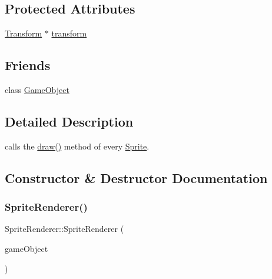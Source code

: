 \subsection*{Protected Attributes}
\begin{DoxyCompactItemize}
\item 
\hyperlink{class_mason_1_1_transform}{Transform} $\ast$ \hyperlink{class_mason_1_1_sprite_renderer_a211ffbdb50dae44315ff54ce808409bc}{transform}
\end{DoxyCompactItemize}
\subsection*{Friends}
\begin{DoxyCompactItemize}
\item 
class \hyperlink{class_mason_1_1_sprite_renderer_a00df87c957d8f7ee0fc51f07a0542f4a}{Game\+Object}
\end{DoxyCompactItemize}


\subsection{Detailed Description}
calls the \hyperlink{class_mason_1_1_sprite_renderer_aeeeaa7eb5c340b7c2abad3d4785fd1e1}{draw()} method of every \hyperlink{class_mason_1_1_sprite}{Sprite}. 

\subsection{Constructor \& Destructor Documentation}
\hypertarget{class_mason_1_1_sprite_renderer_a86df3a66134c1adb0d95b7a63c9432eb}{}\label{class_mason_1_1_sprite_renderer_a86df3a66134c1adb0d95b7a63c9432eb} 
\subsubsection{\texorpdfstring{Sprite\+Renderer()}{SpriteRenderer()}}
{\footnotesize\ttfamily Sprite\+Renderer\+::\+Sprite\+Renderer (\begin{DoxyParamCaption}\item[{std\+::shared\+\_\+ptr$<$ \hyperlink{class_mason_1_1_game_object}{Game\+Object} $>$}]{game\+Object }\end{DoxyParamCaption})\hspace{0.3cm}{\ttfamily [protected]}}



